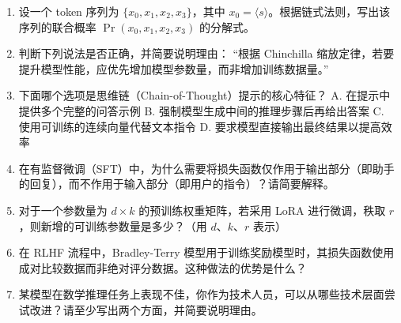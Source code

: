 \begin{exercisebox}
  \begin{enumerate}
    \item 设一个 token 序列为 $\{x_0,x_1,x_2,x_3\}$，其中 $x_0=\langle s\rangle$。根据链式法则，写出该序列的联合概率 $\Pr(x_0,x_1,x_2,x_3)$ 的分解式。
    
    \item 判断下列说法是否正确，并简要说明理由：  
    “根据 Chinchilla 缩放定律，若要提升模型性能，应优先增加模型参数量，而非增加训练数据量。”
    
    \item 下面哪个选项是思维链（Chain-of-Thought）提示的核心特征？  
    A. 在提示中提供多个完整的问答示例  
    B. 强制模型生成中间的推理步骤后再给出答案  
    C. 使用可训练的连续向量代替文本指令  
    D. 要求模型直接输出最终结果以提高效率
    
    \item 在有监督微调（SFT）中，为什么需要将损失函数仅作用于输出部分（即助手的回复），而不作用于输入部分（即用户的指令）？请简要解释。
    
    \item 对于一个参数量为 $d \times k$ 的预训练权重矩阵，若采用 LoRA 进行微调，秩取 $r$，则新增的可训练参数量是多少？（用 $d$、$k$、$r$ 表示）
    
    \item 在 RLHF 流程中，Bradley-Terry 模型用于训练奖励模型时，其损失函数使用成对比较数据而非绝对评分数据。这种做法的优势是什么？
    
    \item 某模型在数学推理任务上表现不佳，你作为技术人员，可以从哪些技术层面尝试改进？请至少写出两个方面，并简要说明理由。
    
  \end{enumerate}
\end{exercisebox}










